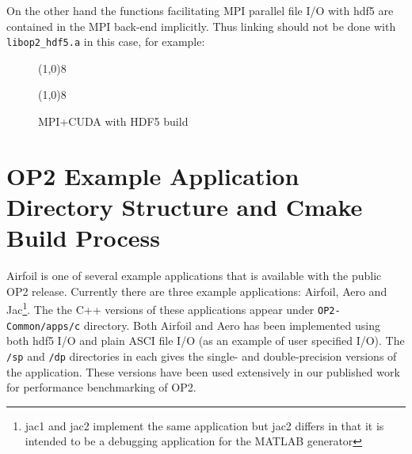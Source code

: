\documentclass[11pt]{article}
\begin{document}
\newpage
\noindent On the other hand the functions facilitating MPI parallel file I/O with hdf5 are contained in the MPI back-end
implicitly. Thus linking should not be done with \texttt{libop2\_hdf5.a} in this case, for example:

\begin{figure}\small
\vspace{-0pt}\noindent\line(1,0){8}\vspace{-20pt}
\vspace{-10pt}\noindent\line(1,0){8}\vspace{-10pt}
\caption{\small MPI+CUDA with HDF5 build }
\normalsize\vspace{-0pt}\label{fig:mpicudahdf5build}
\end{figure}

\newpage\newpage
\section{OP2 Example Application Directory Structure and Cmake Build Process}\label{structure}

Airfoil is one of several example applications that is available with the public OP2 release. Currently there are
three example applications: Airfoil, Aero and Jac\footnote{jac1 and jac2 implement the same application but jac2
differs in that it is intended to be a debugging application for the MATLAB generator}. The the C++ versions of these
applications appear under \texttt{OP2-Common/apps/c} directory. Both Airfoil and Aero has been implemented using both
hdf5 I/O and plain ASCI file I/O (as an example of user specified I/O). The \texttt{/sp} and \texttt{/dp} directories in
each gives the single- and double-precision versions of the application. These versions have been used extensively in
our published work for performance benchmarking of OP2. 
\end{document}
